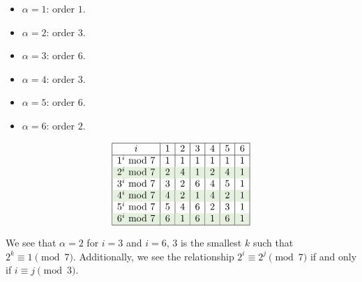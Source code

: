 \begin{minipage}{0.3\textwidth}
    \noindent
    \vspace{-1em}
    \begin{itemize}
        \item $\alpha=1$: order $1$.
        \item $\alpha=2$: order $3$.
        \item $\alpha=3$: order $6$.
        \item $\alpha=4$: order $3$.
        \item $\alpha=5$: order $6$.
        \item $\alpha=6$: order $2$.
    \end{itemize}
    \end{minipage}
\begin{minipage}{0.5\textwidth}
    \[
    \begin{array}{|c|c|c|c|c|c|c|}
    \hline
    i & 1 & 2 & 3 & 4 & 5 & 6 \\
    \hline
    1^i \text{ mod } 7 & 1 & 1 & 1 & 1 & 1 & 1 \\
    \rowcolor{OliveGreen!10}2^i \text{ mod } 7 & 2 & 4 & 1 & 2 & 4 & 1 \\
    3^i \text{ mod } 7 & 3 & 2 & 6 & 4 & 5 & 1 \\
    \rowcolor{OliveGreen!10}4^i \text{ mod } 7 & 4 & 2 & 1 & 4 & 2 & 1 \\
    5^i \text{ mod } 7 & 5 & 4 & 6 & 2 & 3 & 1 \\
    \rowcolor{OliveGreen!10}6^i \text{ mod } 7 & 6 & 1 & 6 & 1 & 6 & 1 \\
    \hline
    \end{array}
    \]
    \end{minipage}

    \vspace{1em}
    \noindent
    We see that $\alpha=2$ for $i=3$ and $i=6$, $3$ is the smallest $k$ such that $2^k\equiv 1\pmod{7}$.
    Additionally, we see the relationship $2^i\equiv 2^j\pmod{7}$ if and only if $i\equiv j\pmod{3}$.
 
